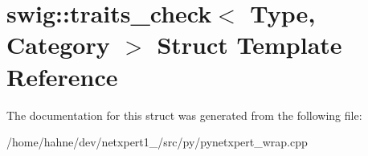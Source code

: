 \hypertarget{structswig_1_1traits__check}{}\section{swig\+:\+:traits\+\_\+check$<$ Type, Category $>$ Struct Template Reference}
\label{structswig_1_1traits__check}


The documentation for this struct was generated from the following file\+:\begin{DoxyCompactItemize}
\item 
/home/hahne/dev/netxpert1\+\_/src/py/pynetxpert\+\_\+wrap.\+cpp\end{DoxyCompactItemize}
